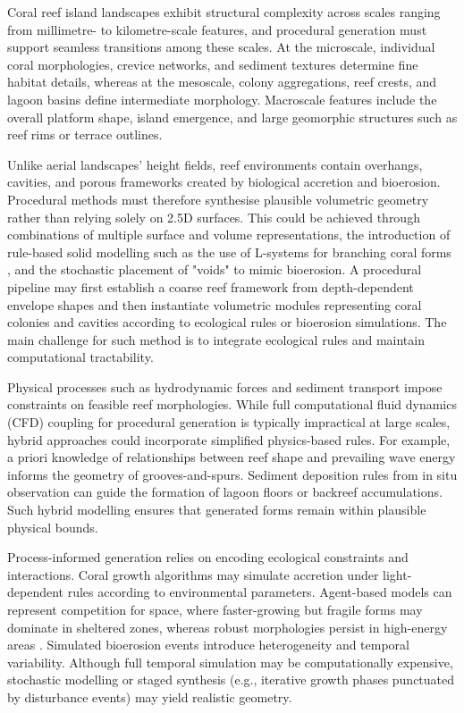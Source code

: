 Coral reef island landscapes exhibit structural complexity across scales ranging from millimetre- to kilometre-scale features, and procedural generation must support seamless transitions among these scales. At the microscale, individual coral morphologies, crevice networks, and sediment textures determine fine habitat details, whereas at the mesoscale, colony aggregations, reef crests, and lagoon basins define intermediate morphology. Macroscale features include the overall platform shape, island emergence, and large geomorphic structures such as reef rims or terrace outlines.

Unlike aerial landscapes' height fields, reef environments contain overhangs, cavities, and porous frameworks created by biological accretion and bioerosion. Procedural methods must therefore synthesise plausible volumetric geometry rather than relying solely on 2.5D surfaces. This could be achieved through combinations of multiple surface and volume representations, the introduction of rule-based solid modelling such as the use of L-systems for branching coral forms \cite{Prusinkiewicz1992, Abela2015}, and the stochastic placement of "voids" to mimic bioerosion. A procedural pipeline may first establish a coarse reef framework from depth-dependent envelope shapes and then instantiate volumetric modules representing coral colonies and cavities according to ecological rules or bioerosion simulations. The main challenge for such method is to integrate ecological rules and maintain computational tractability.

Physical processes such as hydrodynamic forces and sediment transport impose constraints on feasible reef morphologies. While full computational fluid dynamics (CFD) coupling for procedural generation is typically impractical at large scales, hybrid approaches could incorporate simplified physics-based rules. For example, a priori knowledge of relationships between reef shape and prevailing wave energy informs the geometry of grooves-and-spurs. Sediment deposition rules from in situ observation can guide the formation of lagoon floors or backreef accumulations. Such hybrid modelling ensures that generated forms remain within plausible physical bounds.

Process-informed generation relies on encoding ecological constraints and interactions. Coral growth algorithms may simulate accretion under light-dependent rules according to environmental parameters. Agent-based models can represent competition for space, where faster-growing but fragile forms may dominate in sheltered zones, whereas robust morphologies persist in high-energy areas \cite{Anthony2000}. Simulated bioerosion events introduce heterogeneity and temporal variability. Although full temporal simulation may be computationally expensive, stochastic modelling or staged synthesis (e.g., iterative growth phases punctuated by disturbance events) may yield realistic geometry.

